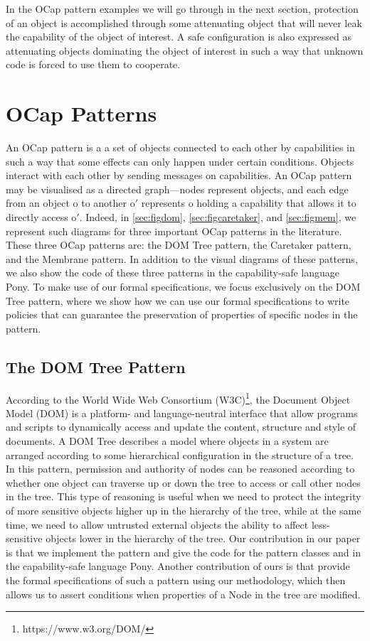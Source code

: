 \documentclass[a4paper,11pt,twoside]{article}
\begin{document}
In the OCap pattern examples we will go through in the next section, protection of an object is accomplished through some attenuating object that will never leak the capability of the object of interest. A safe configuration is also expressed as attenuating objects dominating the object of interest in such a way that unknown code is forced to use them to cooperate.

\newpage
\section{OCap Patterns}\label{sec:ocappatterns}

An OCap pattern is a a set of objects connected to each other by capabilities in such a way that some effects can only happen under certain conditions. Objects interact with each other by sending messages on capabilities. An OCap pattern may be visualised as a directed graph---nodes represent objects, and each edge from an object o to another o$'$ represents o holding a capability that allows it to directly access o$'$. Indeed, in \cref{sec:figdom}, \cref{sec:figcaretaker}, and \cref{sec:figmem}, we represent such diagrams for three important OCap patterns in the literature. These three OCap patterns are: the DOM Tree pattern, the Caretaker pattern, and the Membrane pattern. In addition to the visual diagrams of these patterns, we also show the code of these three patterns in the capability-safe language Pony\cite{clebsch2015}. To make use of our formal specifications, we focus exclusively on the DOM Tree pattern, where we show how we can use our formal specifications to write policies that can guarantee the preservation of properties of specific nodes in the pattern.

\subsection{The DOM Tree Pattern}

According to the World Wide Web Consortium (W3C)\footnote{https://www.w3.org/DOM/}, the Document Object Model (DOM) is a platform- and language-neutral interface that allow programs and scripts to dynamically access and update the content, structure and style of documents. A DOM Tree describes a model where objects in a system are arranged according to some hierarchical configuration in the structure of a tree. In this pattern, permission and authority of nodes can be reasoned according to whether one object can traverse up or down the tree to access or call other nodes in the tree. This type of reasoning is useful when we need to protect the integrity of more sensitive objects higher up in the hierarchy of the tree, while at the same time, we need to allow untrusted external objects the ability to affect less-sensitive objects lower in the hierarchy of the tree. Our contribution in our paper is that we implement the pattern and give the code for the pattern classes  and  in the capability-safe language Pony. Another contribution of ours is that provide the formal specifications of such a pattern using our methodology, which then allows us to assert conditions when properties of a Node in the tree are modified. \\
\end{document}
